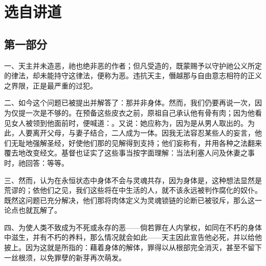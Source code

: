 
\chapter{选自讲道}



\section{第一部分}

一、天主并未造恶，祂也绝非恶的作者；但凡受造的，既蒙赐予以守护祂公义所定的律法，却未能持守这律法，便称为恶。违抗天主，僭越那与自由意志相符的正义之界限，正是最严重的过犯。\par

二、如今这个问题已被提出并解答了：那并非身体。然而，我们仍要再说一次，因为仅提一次是不够的。在预备这些皮衣之前，原祖自己承认他有骨有肉；因为他看见女人被领到他面前时，便喊道：。又说：她应称为，因为是从男人取出的。为此，人要离开父母，与妻子结合，二人成为一体。因我无法容忍某些人的妄言，他们无耻地强解圣经，好使他们那的见解得到支持；他们妄称有，并用各种之法翻来覆去地改变经文。基督也证实了这些事当按字面理解：当法利塞人问及休妻之事时，祂回答：等等。\par

三、然而，认为在永恒状态中身体不会与灵魂共存，因为身体是，这种想法显然是荒谬的；依他们之见，我们这些将在中生活的人，就不该永远被判作腐化的奴仆。既然这问题已充分解决，他们那将肉体定义为灵魂锁链的论断已被驳斥，那么这一论点也就瓦解了。\par

四、为使人类不致成为不死或永存的恶——倘若罪在人内掌权，如同在不朽的身体中滋生，并有不朽的养料，那么情况就会如此——天主因此宣告他必死，并以给他披上。因为这就是所指的：藉着身体的解体，罪得以从根部完全消灭，甚至不留下一丝根须，以免罪孽的新芽再次萌发。\par

